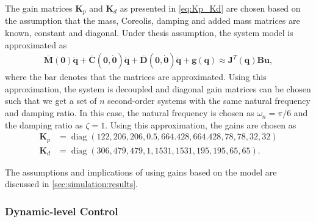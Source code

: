 The gain matrices $\bm{K}_p$ and $\bm{K}_d$ as presented in \autoref{eq:Kp_Kd}
are chosen based on the assumption that the mass, Coreolis, damping and added mass
matrices are known, constant and diagonal. Under thesis assumption, the system model is approximated
as
\begin{align}
    \bar{\bm{M}}(\bm{0}) \ddot{\bm{q}} + \bar{\bm{C}}(\bm{0}, \dot{\bm{0}}) \dot{\bm{q}} +
    \bar{\bm{D}}(\bm{0}, \dot{\bm{0}}) \dot{\bm{q}} + \bm{g}(\bm{q}) \approx \bm{J}^T(\bm{q}) \bm{B} \bm{u},
\end{align}
where the bar denotes that the matrices are approximated. Using this approximation,
the system is decoupled and diagonal gain matrices can be chosen such that we get
a set of $n$ second-order systems with the same natural frequency and damping ratio.
In this case, the natural frequency is chosen as $\omega_n = \pi/6$ and the damping ratio
as $\zeta = 1$. Using this approximation, the gains are chosen as
\begin{subequations}
    \label{eq:kin:gains}
\begin{align}
    \bm{K}_p &= \operatorname{diag}\left(122, 206, 206, 0.5, 664.428, 664.428, 78, 78, 32, 32\right) \\
    \bm{K}_d &= \operatorname{diag}\left(306, 479, 479, 1, 1531, 1531, 195, 195, 65, 65\right).
\end{align}
\end{subequations}

The assumptions and implications of using gains based on the model are discussed
in \autoref{sec:simulation:results}.

\subsubsection{Dynamic-level Control}

